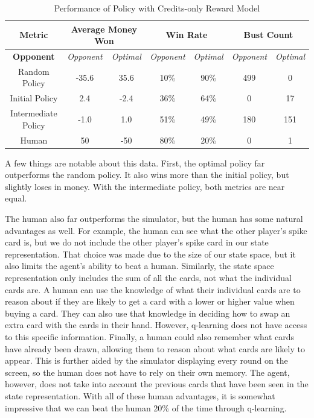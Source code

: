 \documentclass{article}
\begin{document}
\begin{table}[H]
\centering
\caption{Performance of Policy with Credits-only Reward Model}
\begin{tabular}{ c | c | c | c | c | c | c }
 \textbf{Metric} & \multicolumn{2}{|c|}{\textbf{Average Money Won}} & \multicolumn{2}{|c|}{\textbf{Win Rate}} & \multicolumn{2}{|c}{\textbf{Bust Count}} \\ \hline 
 \textbf{Opponent}  & \textit{Opponent} & \textit{Optimal} & \textit{Opponent} & \textit{Optimal} & \textit{Opponent} & \textit{Optimal} \\ \hline
 Random Policy & -35.6 & 35.6 & 10\% & 90\% & 499 & 0\\
 Initial Policy & 2.4 & -2.4 & 36\% & 64\% & 0 & 17 \\
 Intermediate Policy & -1.0 & 1.0 & 51\% & 49\% & 180 & 151 \\
 Human  & 50 & -50 & 80\% & 20\% & 0 & 1 \\
\end{tabular}
\label{tab:results1}
\end{table}

A few things are notable about this data. First, the optimal policy far outperforms the random policy. It also wins more than the initial policy, but slightly loses in money. With the intermediate policy, both metrics are near equal.

The human also far outperforms the simulator, but the human has some natural advantages as well. For example, the human can see what the other player's spike card is, but we do not include the other player's spike card in our state representation. That choice was made due to the size of our state space, but it also limits the agent's ability to beat a human. Similarly, the state space representation only includes the sum of all the cards, not what the individual cards are. A human can use the knowledge of what their individual cards are to reason about if they are likely to get a card with a lower or higher value when buying a card. They can also use that knowledge in deciding how to swap an extra card with the cards in their hand. However, q-learning does not have access to this specific information. Finally, a human could also remember what cards have already been drawn, allowing them to reason about what cards are likely to appear. This is further aided by the simulator displaying every round on the screen, so the human does not have to rely on their own memory. The agent, however, does not take into account the previous cards that have been seen in the state representation. With all of these human advantages, it is somewhat impressive that we can beat the human 20\% of the time through q-learning.
\end{document}
